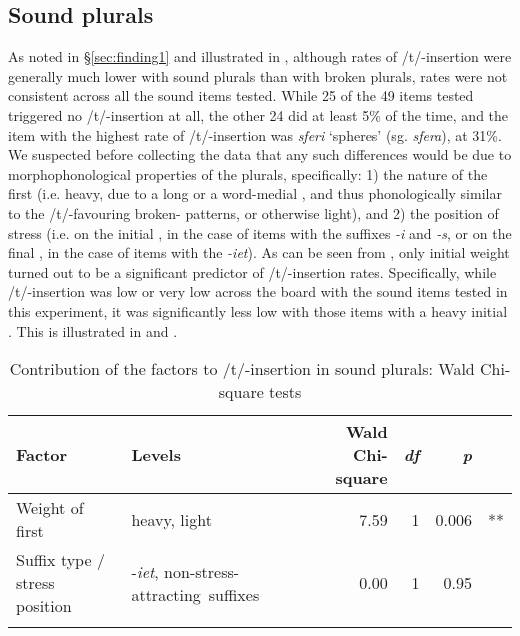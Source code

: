\documentclass[output=paper]{langsci/langscibook}
\begin{document}
\largerpage[-1]
\subsection{Sound plurals}
As noted in §\ref{sec:finding1} and illustrated in , although rates of /t/-insertion were generally much lower with sound plurals than with broken plurals, rates were not consistent across all the sound  items tested. While 25 of the 49 items tested triggered no /t/-insertion at all, the other 24 did at least 5\% of the time, and the item with the highest rate of /t/-insertion was \textit{sferi} ‘spheres’ (sg. \textit{sfera}), at 31\%. We suspected before collecting the data that any such differences would be due to morphophonological properties of the plurals, specifically: 1) the nature of the first  (i.e. heavy, due to a long  or a word-medial , and thus phonologically similar to the /t/-favouring broken- patterns, or otherwise light), and 2) the position of stress (i.e. on the initial , in the case of items with the  suffixes \textit{{}-i} and \textit{{}-s}, or on the final , in the case of items with the   \textit{{}-iet}). As can be seen from , only initial  weight turned out to be a significant predictor of /t/-insertion rates. Specifically, while /t/-insertion was low or very low across the board with the sound  items tested in this experiment, it was significantly less low with those items with a heavy initial . This is illustrated in  and .

\begin{table}
\begin{tabularx}{\textwidth}{p{2.3cm}Qr rrc}
\lsptoprule
\bfseries Factor & \bfseries Levels & \bfseries Wald Chi-square & \bfseries \textit{df} & \bfseries \textit{p} & \\
\midrule
Weight of first  & heavy, light &7.59 & 1 & 0.006 & **\\
\tablevspace
Suffix type / stress position & {}-\textit{iet}, \mbox{non-stress-attracting suffixes} &0.00 & 1 & 0.95 & \\
\lspbottomrule
\end{tabularx}
\caption{
Contribution of the factors to /t/-insertion in sound plurals: Wald Chi-square tests
}
\label{tab:lucas:8}
\end{table}
\end{document}
